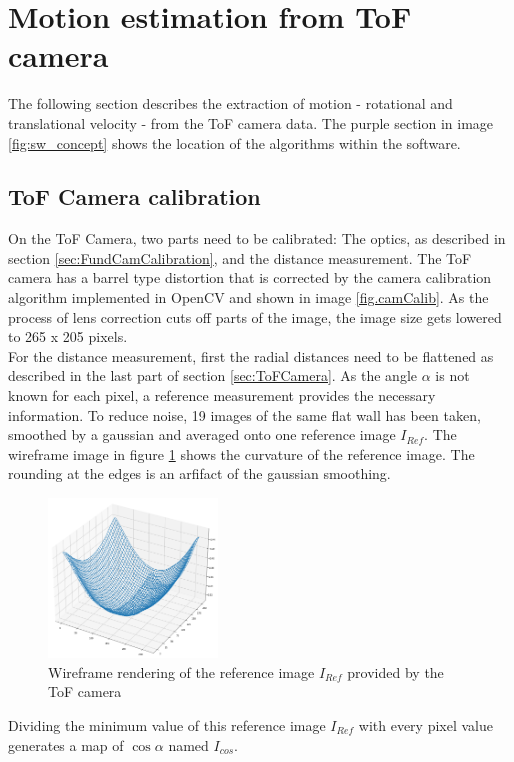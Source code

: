 \section{Motion estimation from ToF camera}
The following section describes the extraction of motion - rotational and translational velocity - from the ToF camera data. The purple section in image \ref{fig:sw_concept} shows the location of the algorithms within the software.
\subsection{ToF Camera calibration}
\label{sec:ToFCalibration}
On the ToF Camera, two parts need to be calibrated: The optics, as described in section \ref{sec:FundCamCalibration}, and the distance measurement. The ToF camera has a barrel type distortion that is corrected by the camera calibration algorithm implemented in OpenCV\cite{openCVCamCalib} and shown in image \ref{fig.camCalib}. As the process of lens correction cuts off parts of the image, the image size gets lowered to 265 x 205 pixels.\\
For the distance measurement, first the radial distances need to be flattened as described in the last part of section \ref{sec:ToFCamera}. As the angle $\alpha$ is not known for each pixel, a reference measurement provides the necessary information. To reduce noise, 19 images of the same flat wall has been taken, smoothed by a gaussian and averaged onto one reference image $I_{Ref}$. The wireframe image in figure \ref{im:ToFRaw} shows the curvature of the reference image. The rounding at the edges is an arfifact of the gaussian smoothing.\\
\begin{figure}[H]
    \centering
    \includegraphics[width=0.4\textwidth]{images/raw_tof_radial.png}
    \caption{Wireframe rendering of the reference image $I_{Ref}$ provided by the ToF camera}
    \label{im:ToFRaw}
\end{figure}
Dividing the minimum value of this reference image $I_{Ref}$ with every pixel value generates a map of $\cos \alpha$ named $I_{cos}$.

